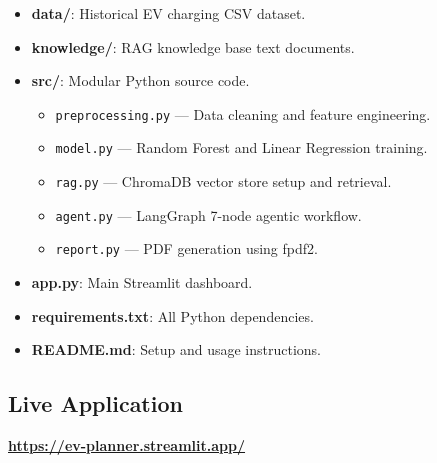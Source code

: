 \documentclass[conference]{IEEEtran}
\begin{document}
\begin{itemize}
    \item \textbf{data/}: Historical EV charging CSV dataset.
    \item \textbf{knowledge/}: RAG knowledge base text documents.
    \item \textbf{src/}: Modular Python source code.
    \begin{itemize}
        \item \texttt{preprocessing.py} — Data cleaning and feature engineering.
        \item \texttt{model.py} — Random Forest and Linear Regression training.
        \item \texttt{rag.py} — ChromaDB vector store setup and retrieval.
        \item \texttt{agent.py} — LangGraph 7-node agentic workflow.
        \item \texttt{report.py} — PDF generation using fpdf2.
    \end{itemize}
    \item \textbf{app.py}: Main Streamlit dashboard.
    \item \textbf{requirements.txt}: All Python dependencies.
    \item \textbf{README.md}: Setup and usage instructions.
\end{itemize}

\subsection{Live Application}

\begin{center}
\textbf{\url{https://ev-planner.streamlit.app/}}
\end{center}
\end{document}
